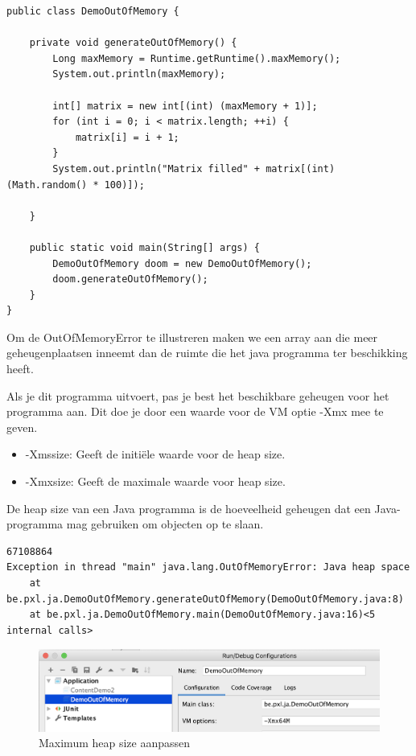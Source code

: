 \begin{lstlisting}
public class DemoOutOfMemory {

	private void generateOutOfMemory() {
		Long maxMemory = Runtime.getRuntime().maxMemory();
		System.out.println(maxMemory);

		int[] matrix = new int[(int) (maxMemory + 1)];
		for (int i = 0; i < matrix.length; ++i) {
			matrix[i] = i + 1;
		}
		System.out.println("Matrix filled" + matrix[(int)(Math.random() * 100)]);

	}

	public static void main(String[] args) {
		DemoOutOfMemory doom = new DemoOutOfMemory();
		doom.generateOutOfMemory();
	}
}
\end{lstlisting}

Om de OutOfMemoryError te illustreren maken we een array aan die meer geheugenplaatsen inneemt dan de ruimte die het java programma ter beschikking heeft.

Als je dit programma uitvoert, pas je best het beschikbare geheugen voor het programma aan. Dit doe je door een waarde voor de VM optie -Xmx mee te geven.

\begin{itemize}
\item -Xmssize: Geeft de initi\"ele waarde voor de heap size.
\item -Xmxsize: Geeft de maximale waarde voor heap size.
\end{itemize}

De heap size van een Java programma is de hoeveelheid geheugen dat een Java-programma mag gebruiken om objecten op te slaan.

\begin{verbatim}
67108864
Exception in thread "main" java.lang.OutOfMemoryError: Java heap space
	at be.pxl.ja.DemoOutOfMemory.generateOutOfMemory(DemoOutOfMemory.java:8)
	at be.pxl.ja.DemoOutOfMemory.main(DemoOutOfMemory.java:16)<5 internal calls>
\end{verbatim}
	
\begin{figure}[H]
\includegraphics[width=\linewidth]{images/h2/jvm_options_xmx.png}
\caption{Maximum heap size aanpassen}
\label{fig:exceptiono_hierarchy}
\end{figure}

